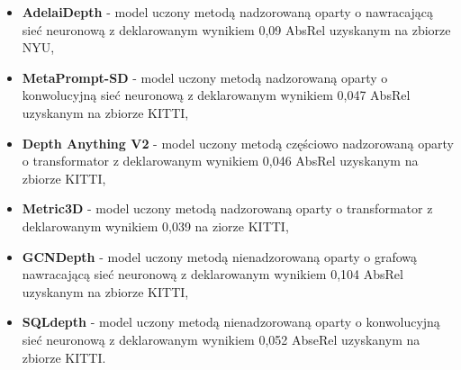 \begin{itemize} 
    \item \textbf{AdelaiDepth} - model uczony metodą nadzorowaną oparty o nawracającą sieć neuronową z deklarowanym wynikiem 0,09 AbsRel uzyskanym na zbiorze NYU,
    \item \textbf{MetaPrompt-SD} - model uczony metodą nadzorowaną oparty o konwolucyjną sieć neuronową z deklarowanym wynikiem 0,047 AbsRel uzyskanym na zbiorze KITTI, 
    \item \textbf{Depth Anything V2} - model uczony metodą częściowo nadzorowaną oparty o transformator z deklarowanym wynikiem 0,046 AbsRel uzyskanym na zbiorze KITTI, 
    \item \textbf{Metric3D} - model uczony metodą nadzorowaną oparty o transformator z deklarowanym wynikiem 0,039 na ziorze KITTI, 
    \item \textbf{GCNDepth} - model uczony metodą nienadzorowaną oparty o grafową nawracającą sieć neuronową z deklarowanym wynikiem 0,104 AbsRel uzyskanym na zbiorze KITTI,
    \item \textbf{SQLdepth} - model uczony metodą nienadzorowaną oparty o konwolucyjną sieć neuronową z deklarowanym wynikiem 0,052 AbseRel uzyskanym na zbiorze KITTI.
\end{itemize}